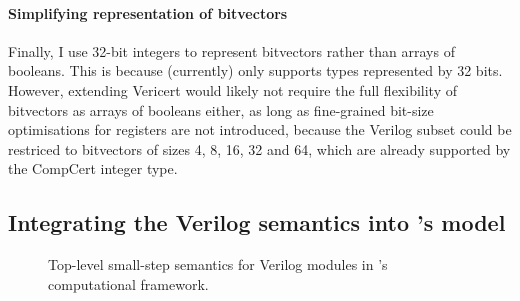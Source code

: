 \paragraph{Simplifying representation of bitvectors} Finally, I use 32-bit
integers to represent bitvectors rather than arrays of booleans. This is because
\vericert{} (currently) only supports types represented by 32 bits.  However,
extending Vericert would likely not require the full flexibility of bitvectors
as arrays of booleans either, as long as fine-grained bit-size optimisations for
registers are not introduced, because the Verilog subset could be restriced to
bitvectors of sizes 4, 8, 16, 32 and 64, which are already supported by the
CompCert integer type.

\subsection{Integrating the Verilog semantics into \compcert{}'s model}
\label{sec:verilog:integrating}

\begin{figure*}
  \centering
  \begin{minipage}{1.0\linewidth}
  \end{minipage}
  \caption{Top-level small-step semantics for Verilog modules in \compcert{}'s computational framework.}%
  \label{fig:inference_module}
\end{figure*}

